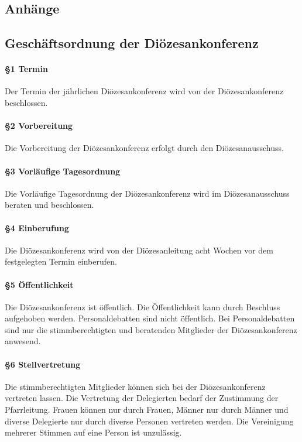 \documentclass[12pt]{report}
\begin{document}
\begin{flushleft}
\part*{Anhänge}

\chapter*{Geschäftsordnung der Diözesankonferenz}

\subsection*{§1 Termin}
Der Termin der jährlichen Diözesankonferenz wird von der Diözesankonferenz beschlossen.
\subsection*{§2 Vorbereitung}
Die Vorbereitung der Diözesankonferenz erfolgt durch den Diözesanausschuss.
\subsection*{§3 Vorläufige Tagesordnung}
Die Vorläufige Tagesordnung der Diözesankonferenz wird im Diözesanausschuss beraten und beschlossen.
\subsection*{§4 Einberufung}
Die Diözesankonferenz wird von der Diözesanleitung acht Wochen vor dem festgelegten Termin einberufen.
\subsection*{§5 Öffentlichkeit}
Die Diözesankonferenz ist öffentlich. Die Öffentlichkeit kann durch Beschluss aufgehoben werden.
Personaldebatten sind nicht öffentlich. Bei Personaldebatten sind nur die stimmberechtigten und beratenden
Mitglieder der Diözesankonferenz anwesend.
\subsection*{§6 Stellvertretung}
Die stimmberechtigten Mitglieder können sich bei der Diözesankonferenz vertreten lassen. Die Vertretung
der Delegierten bedarf der Zustimmung der Pfarrleitung. Frauen können nur durch Frauen, Männer nur durch
Männer und diverse Delegierte nur durch diverse Personen vertreten werden. Die Vereinigung mehrerer Stimmen auf eine Person ist unzulässig.

\end{flushleft}
\end{document}
